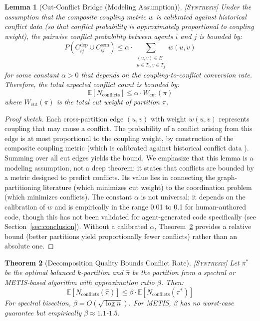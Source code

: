 \documentclass[11pt, a4paper, logo, copyright]{googledeepmind}
\newtheorem{theorem}{Theorem}[section]
\newtheorem{lemma}[theorem]{Lemma}
\newcommand{\synthesis}{\textsc{[Synthesis]}}
\begin{document}
\begin{lemma}[Cut-Conflict Bridge (Modeling Assumption)] \synthesis{}
\label{lem:bridge}
Under the assumption that the composite coupling metric $w$ is calibrated against historical conflict data (so that conflict probability is approximately proportional to coupling weight), the pairwise conflict probability between agents $i$ and $j$ is bounded by:
\begin{equation}
  P(C_{ij}^{\mathrm{dep}} \cup C_{ij}^{\mathrm{sem}}) \leq \alpha \cdot \sum_{\substack{(u,v) \in E \\ u \in T_i, v \in T_j}} w(u,v)
\end{equation}
for some constant $\alpha > 0$ that depends on the coupling-to-conflict conversion rate.
Therefore, the total expected conflict count is bounded by:
\begin{equation}
  \mathbb{E}[N_{\mathrm{conflicts}}] \leq \alpha \cdot W_{\mathrm{cut}}(\pi)
\end{equation}
where $W_{\mathrm{cut}}(\pi)$ is the total cut weight of partition $\pi$.
\end{lemma}

\begin{proof}[Proof sketch]
Each cross-partition edge $(u,v)$ with weight $w(u,v)$ represents coupling that may cause a conflict.
The probability of a conflict arising from this edge is at most proportional to the coupling weight, by construction of the composite coupling metric (which is calibrated against historical conflict data \citep{KasiSarma2013}).
Summing over all cut edges yields the bound.
We emphasize that this lemma is a modeling assumption, not a deep theorem: it states that conflicts are bounded by a metric designed to predict conflicts. Its value lies in connecting the graph-partitioning literature (which minimizes cut weight) to the coordination problem (which minimizes conflicts). The constant $\alpha$ is not universal; it depends on the calibration of $w$ and is empirically in the range 0.01 to 0.1 for human-authored code, though this has not been validated for agent-generated code specifically (see Section~\ref{sec:conclusion}). Without a calibrated $\alpha$, Theorem~\ref{thm:decomp-quality} provides a relative bound (better partitions yield proportionally fewer conflicts) rather than an absolute one.
\end{proof}

\begin{theorem}[Decomposition Quality Bounds Conflict Rate] \synthesis{}
\label{thm:decomp-quality}
Let $\pi^*$ be the optimal balanced $k$-partition and $\hat{\pi}$ be the partition from a spectral or METIS-based algorithm with approximation ratio $\beta$.
Then:
\begin{equation}
  \mathbb{E}[N_{\mathrm{conflicts}}(\hat{\pi})] \leq \beta \cdot \mathbb{E}[N_{\mathrm{conflicts}}(\pi^*)]
\end{equation}
For spectral bisection, $\beta = O(\sqrt{\log n})$.
For METIS, $\beta$ has no worst-case guarantee but empirically $\beta \approx 1.1$-$1.5$.
\end{theorem}
\end{document}
